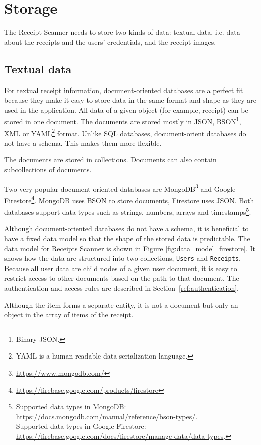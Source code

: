 \documentclass[
  digital, %
  table,   %
  oneside, %
  lof,     %
  lot,     %
]{fithesis3}
\newcommand{\definition}[1]{{#1}}
\begin{document}
\section{Storage}
\label{sec:storage}
The Receipt Scanner needs to store two kinds of data: textual data, i.e. data about the receipts and the users' credentials, and the receipt images.

\subsection{Textual data}
For textual receipt information, document-oriented databases are a perfect fit because they make it easy to store data in the same format and shape as they are used in the application. 
All data of a given object (for example, receipt) can be stored in one document. The documents are stored mostly in JSON, BSON\footnote{Binary JSON.}, XML or YAML\footnote{\definition{YAML} is a human-readable data-serialization language.} format. Unlike SQL databases, document-orient databases do not have a schema. This makes them more flexible.

The documents are stored in collections. Documents can also contain subcollections of documents.

Two very popular document-oriented databases are MongoDB\footnote{\url{https://www.mongodb.com/}} and Google Firestore\footnote{\url{https://firebase.google.com/products/firestore}}. MongoDB uses BSON to store documents, Firestore uses JSON. Both databases support data types such as strings, numbers, arrays and timestamps\footnote{Supported data types in MongoDB: \url{https://docs.mongodb.com/manual/reference/bson-types/}.\\Supported data types in Google Firestore: \url{https://firebase.google.com/docs/firestore/manage-data/data-types}.}.

Although document-oriented databases do not have a schema, it is beneficial to have a fixed data model so that the shape of the stored data is predictable.
The data model for Receipts Scanner is shown in Figure \ref{fig:data_model_firestore}. It shows how the data are structured into two collections, \texttt{Users} and \texttt{Receipts}. Because all user data are child nodes of a given user document, it is easy to restrict access to other documents based on the path to that document. The authentication and access rules are described in Section~\ref{ref:authentication}.

Although the item forms a separate entity, it is not a document but only an object in the array of items of the receipt.
\end{document}
